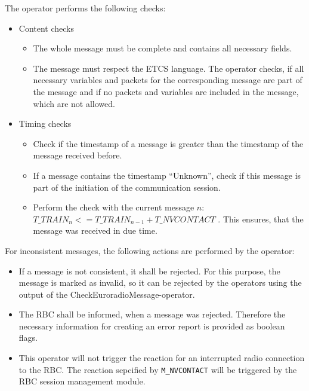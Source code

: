 The operator performs the following checks:
\begin{itemize}
 \item Content checks
 \begin{itemize}
    \item The whole message must be complete and contains all necessary fields. \cite[3.16.1.1]{subset-026}
    \item The message must respect the ETCS language. \cite[3.16.1.1]{subset-026} The operator checks, if all necessary variables and packets for the corresponding message are part of the message and if no packets and variables are included in the message, which are not allowed.
  \end{itemize}
  \item Timing checks
  \begin{itemize}
    \item Check if the timestamp of a message is greater than the timestamp of the message received before. \cite[3.16.3.3.3]{subset-026}
    \item If a message contains the timestamp ``Unknown'', check if this message is part of the initiation of the communication session. \cite[3.16.3.3.4]{subset-026}
    \item Perform the check with the current message $n$:  $T\_TRAIN_{n} <= T\_TRAIN_{n-1} + T\_NVCONTACT$ \cite[3.16.1.1]{subset-026}. This ensures, that the message was received in due time.
  \end{itemize}
\end{itemize}

For inconsistent messages, the following actions are performed by the operator:

\begin{itemize}
  \item If a message is not consistent, it shall be rejected. \cite[3.16.3.1.1.1]{subset-026} For this purpose, the message is marked as invalid, so it can be rejected by the operators using the output of the CheckEuroradioMessage-operator.
  \item The RBC shall be informed, when a message was rejected. \cite[3.16.3.1.1.2]{subset-026} Therefore the necessary information for creating an error report is provided as boolean flags. 
  \item This operator will not trigger the reaction for an interrupted radio connection to the RBC. The reaction sepcified by \texttt{M\_NVCONTACT} will be triggered by the RBC session management module.
\end{itemize}

